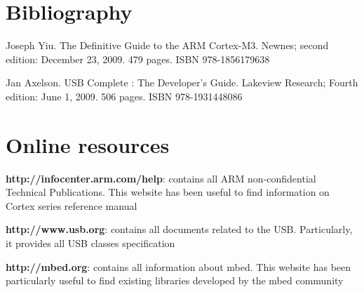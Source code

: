 \documentclass[pdftex,10pt,a4paper]{report}
\newenvironment{packed_item}{
\begin{itemize}
  \setlength{\itemsep}{1pt}
  \setlength{\parskip}{0pt}
  \setlength{\parsep}{0pt}
}{\end{itemize}}
\begin{document}
\section{Bibliography}
\begin{packed_item}
	\item Joseph Yiu. The Definitive Guide to the ARM Cortex-M3. Newnes; second edition: December 23, 2009. 479 pages. ISBN 978-1856179638
	\item Jan Axelson. USB Complete : The Developer's Guide. Lakeview Research; Fourth edition: June 1, 2009. 506 pages. ISBN 978-1931448086
\end{packed_item}


\section{Online resources}
\begin{packed_item}
	\item \textbf{http://infocenter.arm.com/help}: contains all ARM non-confidential Technical Publications. This website has been useful to find information on Cortex series reference manual
	\item \textbf{http://www.usb.org}: contains all documents related to the USB. Particularly, it provides all USB classes specification
	\item \textbf{http://mbed.org}: contains all information about mbed. This website has been particularly useful to find existing libraries developed by the mbed community
\end{packed_item}
\end{document}
